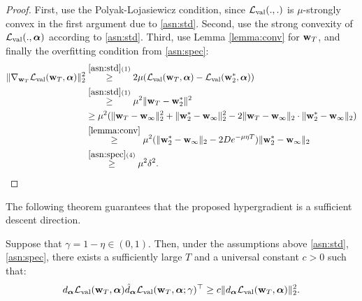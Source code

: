 \begin{proof}
    First, use the Polyak-Lojasiewicz condition, since $\mathcal{L}_{\mathrm{val}}(., .)$ is $\mu$-strongly convex in the first argument due to \ref{asn:std}. Second, use the strong convexity of $\mathcal{L}_{\mathrm{val}}(., \boldsymbol{\mathbf{\alpha}})$ according to \ref{asn:std}. Third, use Lemma \ref{lemma:conv} for $\boldsymbol{\mathbf{w}}_T$, and finally the overfitting condition from \ref{asn:spec}:
    \begin{align*}
        \|\nabla_{\boldsymbol{\mathbf{w}}_T}\mathcal{L}_{\mathrm{val}}(\boldsymbol{\mathbf{w}}_T, \boldsymbol{\mathbf{\alpha}})\|_2^2 &\stackrel{\ref{asn:std}(1)}{\geq} 2\mu(\mathcal{L}_{\mathrm{val}}(\boldsymbol{\mathbf{w}}_T, \boldsymbol{\mathbf{\alpha}}) - \mathcal{L}_{\mathrm{val}}(\boldsymbol{\mathbf{w}}_2^*, \boldsymbol{\mathbf{\alpha}})) \\
        &\stackrel{\ref{asn:std}(1)}{\geq} \mu^2\|\boldsymbol{\mathbf{w}}_T - \boldsymbol{\mathbf{w}}_2^*\|^2 \\
        &\geq \mu^2(\|\boldsymbol{\mathbf{w}}_T - \boldsymbol{\mathbf{w}}_\infty\|_2^2 + \|\boldsymbol{\mathbf{w}}_2^* - \boldsymbol{\mathbf{w}}_{\infty}\|_2^2 - 2\|\boldsymbol{\mathbf{w}}_T - \boldsymbol{\mathbf{w}}_\infty\|_2\cdot\|\boldsymbol{\mathbf{w}}_2^* - \boldsymbol{\mathbf{w}}_\infty\|_2) \\
        &\stackrel{\ref{lemma:conv}}{\geq} \mu^2(\|\boldsymbol{\mathbf{w}}_2^* - \boldsymbol{\mathbf{w}}_{\infty}\|_2 - 2De^{-\mu\eta T})\|\boldsymbol{\mathbf{w}}_2^* - \boldsymbol{\mathbf{w}}_\infty\|_2 \\
        &\stackrel{\ref{asn:spec}(4)}{\geq} \mu^2\delta^2.
    \end{align*}
\end{proof}
The following theorem guarantees that the proposed hypergradient is a sufficient descent direction.
\begin{theorem}
    Suppose that $\gamma = 1 - \eta \in (0, 1)$. Then, under the assumptions above \ref{asn:std}, \ref{asn:spec}, there exists a sufficiently large $T$ and a universal constant $c > 0$ such that:
    \begin{align*}
        d_{\boldsymbol{\mathbf{\alpha}}}\mathcal{L}_{\mathrm{val}}(\boldsymbol{\mathbf{w}}_T, \boldsymbol{\mathbf{\alpha}}) \hat{d}_{\boldsymbol{\mathbf{\alpha}}}\mathcal{L}_{\mathrm{val}}(\boldsymbol{\mathbf{w}}_T, \boldsymbol{\mathbf{\alpha}}; \gamma)^\top \geq c \|d_{\boldsymbol{\mathbf{\alpha}}}\mathcal{L}_{\mathrm{val}}(\boldsymbol{\mathbf{w}}_T, \boldsymbol{\mathbf{\alpha}})\|_2^2.
    \end{align*}
\end{theorem}


